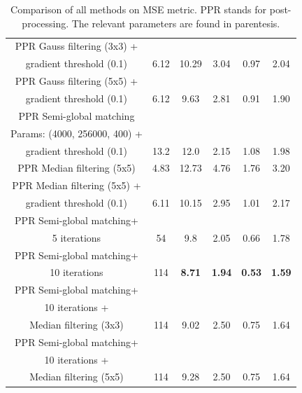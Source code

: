\documentclass  [
  paper    = a4,
  BCOR     = 10mm,
  twoside,
  fontsize = 12pt,
  fleqn,
  toc      = bibnumbered,
  toc      = listofnumbered,
  numbers  = noendperiod,
  headings = normal,
  listof   = leveldown,
  version  = 3.03
]                                       {scrreprt}
\begin{document}
\begin{table}[h!]
\begin{tabular}{|c|c|c|c|c|c|}
		\hline
		PPR Gauss filtering (3x3) +&&&&&\\
		 gradient threshold (0.1) & 6.12 & 10.29 & 3.04 & 0.97 &2.04\\
		\hline
		PPR Gauss filtering (5x5) +&&&&&\\
		gradient threshold (0.1) & 6.12 & 9.63 & 2.81 & 0.91 & 1.90\\
		\hline
		PPR Semi-global matching&&&&&\\
		Params: (4000, 256000, 400) +&&&&&\\
		gradient threshold (0.1) & 13.2 &12.0 & 2.15 & 1.08 & 1.98\\
		\hline
		PPR Median filtering (5x5) & 4.83 & 12.73 & 4.76 & 1.76 & 3.20 \\
		\hline 
		PPR Median filtering (5x5) +&&&&&\\
		gradient threshold (0.1)  & 6.11& 10.15 & 2.95 & 1.01 &2.17 \\
		\hline
		PPR Semi-global matching+&&&&&\\
		5 iterations & 54 & 9.8  & 2.05 & 0.66 & 1.78  \\
		\hline
		PPR Semi-global matching+&&&&&\\
		10 iterations  & 114 & \textbf{8.71} & \textbf{1.94} & \textbf{0.53} & \textbf{1.59} \\
		\hline
		PPR Semi-global matching+&&&&&\\
		10 iterations +&&&&&\\
		 Median filtering (3x3) & 114 & 9.02 & 2.50 & 0.75 & 1.64 \\
		\hline
		PPR Semi-global matching+&&&&&\\
		10 iterations +&&&&&\\
		Median filtering (5x5) & 114 & 9.28 & 2.50 & 0.75 & 1.64 \\
		\hline
	\end{tabular}
\caption[Comparison of runtime and MSE of different methods.]{Comparison of all methods on MSE metric. PPR stands for post-processing. The relevant parameters are found in parentesis.} 
\label{tab:comparison}
\end{table}
\end{document}
